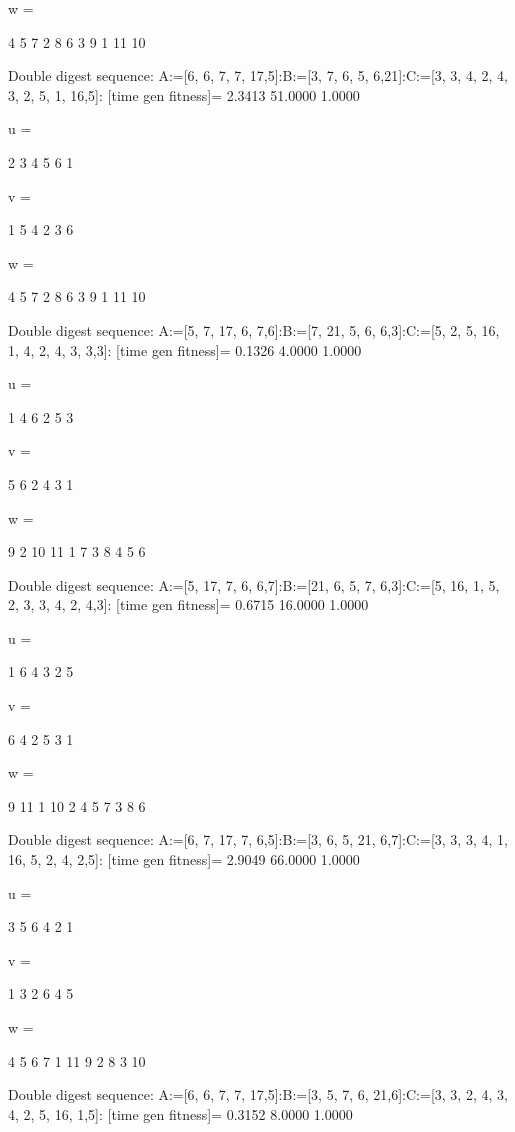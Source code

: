 w =

     4     5     7     2     8     6     3     9     1    11    10

Double digest sequence:
A:=[6, 6, 7, 7, 17,5]:B:=[3, 7, 6, 5, 6,21]:C:=[3, 3, 4, 2, 4, 3, 2, 5, 1, 16,5]:
[time gen fitness]=
    2.3413   51.0000    1.0000


u =

     2     3     4     5     6     1


v =

     1     5     4     2     3     6


w =

     4     5     7     2     8     6     3     9     1    11    10

Double digest sequence:
A:=[5, 7, 17, 6, 7,6]:B:=[7, 21, 5, 6, 6,3]:C:=[5, 2, 5, 16, 1, 4, 2, 4, 3, 3,3]:
[time gen fitness]=
    0.1326    4.0000    1.0000


u =

     1     4     6     2     5     3


v =

     5     6     2     4     3     1


w =

     9     2    10    11     1     7     3     8     4     5     6

Double digest sequence:
A:=[5, 17, 7, 6, 6,7]:B:=[21, 6, 5, 7, 6,3]:C:=[5, 16, 1, 5, 2, 3, 3, 4, 2, 4,3]:
[time gen fitness]=
    0.6715   16.0000    1.0000


u =

     1     6     4     3     2     5


v =

     6     4     2     5     3     1


w =

     9    11     1    10     2     4     5     7     3     8     6

Double digest sequence:
A:=[6, 7, 17, 7, 6,5]:B:=[3, 6, 5, 21, 6,7]:C:=[3, 3, 3, 4, 1, 16, 5, 2, 4, 2,5]:
[time gen fitness]=
    2.9049   66.0000    1.0000


u =

     3     5     6     4     2     1


v =

     1     3     2     6     4     5


w =

     4     5     6     7     1    11     9     2     8     3    10

Double digest sequence:
A:=[6, 6, 7, 7, 17,5]:B:=[3, 5, 7, 6, 21,6]:C:=[3, 3, 2, 4, 3, 4, 2, 5, 16, 1,5]:
[time gen fitness]=
    0.3152    8.0000    1.0000


